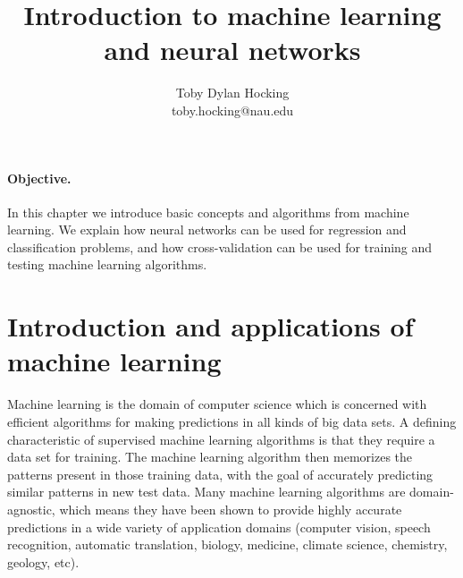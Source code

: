 \documentclass[12pt]{article}
\begin{document}
\title{Introduction to machine learning and neural networks}

\author{
  Toby Dylan Hocking\\
  toby.hocking@nau.edu
}

\maketitle









\paragraph{Objective.} In this chapter we introduce basic concepts and
algorithms from machine learning. We explain how neural networks can
be used for regression and classification problems, and how
cross-validation can be used for training and testing machine learning
algorithms.

\section{Introduction and applications of machine learning}

Machine learning is the domain of computer science which is concerned
with efficient algorithms for making predictions in all kinds of big
data sets. A defining characteristic of supervised machine learning
algorithms is that they require a data set for training. The machine
learning algorithm then memorizes the patterns present in those
training data, with the goal of accurately predicting similar patterns
in new test data. Many machine learning algorithms are
domain-agnostic, which means they have been shown to provide highly
accurate predictions in a wide variety of application domains
(computer vision, speech recognition, automatic translation, biology,
medicine, climate science, chemistry, geology, etc). 
\end{document}
